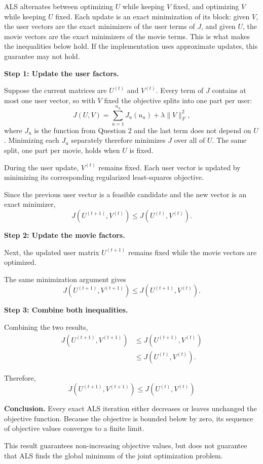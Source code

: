ALS alternates between optimizing $U$ while keeping $V$
fixed, and optimizing $V$ while keeping $U$ fixed. Each
update is an exact minimization of its block: given $V$,
the user vectors are the exact minimizers of the
user terms of $J$, and given $U$, the movie vectors are
the exact minimizers of the movie terms. This is what makes
the inequalities below hold. If the implementation uses
approximate updates, this guarantee may not hold.

\textbf{Step 1: Update the user factors.}

Suppose the current matrices are $U^{(t)}$ and $V^{(t)}$.
Every term of $J$ contains at most one user vector, so with $V$
fixed the objective splits into one part per user:
\[
J(U,V)=\sum_{u=1}^{n_u}J_u(u_u)+\lambda\|V\|_F^2,
\]
where $J_u$ is the function from Question 2 and the last term
does not depend on $U$. Minimizing each $J_u$ separately
therefore minimizes $J$ over all of $U$. The same split, one
part per movie, holds when $U$ is fixed.

During the user update, $V^{(t)}$ remains fixed. Each
user vector is updated by minimizing its corresponding
regularized least-squares objective.

Since the previous user vector is a feasible candidate
and the new vector is an exact minimizer,
\[
J(U^{(t+1)},V^{(t)})
\leq
J(U^{(t)},V^{(t)}).
\]

\textbf{Step 2: Update the movie factors.}

Next, the updated user matrix $U^{(t+1)}$ remains fixed
while the movie vectors are optimized.

The same minimization argument gives
\[
J(U^{(t+1)},V^{(t+1)})
\leq
J(U^{(t+1)},V^{(t)}).
\]

\textbf{Step 3: Combine both inequalities.}

Combining the two results,
\[
\begin{aligned}
J(U^{(t+1)},V^{(t+1)})
&\leq J(U^{(t+1)},V^{(t)})\\
&\leq J(U^{(t)},V^{(t)}).
\end{aligned}
\]

Therefore,
\[
\boxed{
J(U^{(t+1)},V^{(t+1)})
\leq J(U^{(t)},V^{(t)})
}
\]

\textbf{Conclusion.} Every exact ALS iteration either
decreases or leaves unchanged the objective function.
Because the objective is bounded below by zero, its
sequence of objective values converges to a finite limit.

This result guarantees non-increasing objective values,
but does not guarantee that ALS finds the global minimum
of the joint optimization problem.

